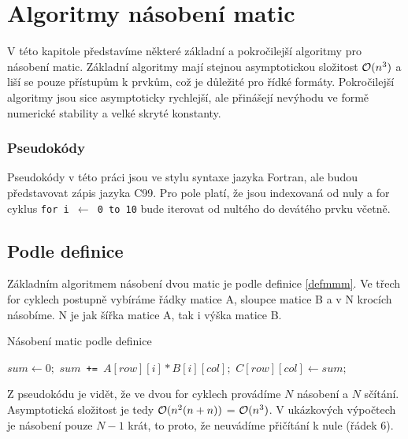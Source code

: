 \chapter{Algoritmy násobení matic}
\label{algo}

V této kapitole představíme některé základní a pokročilejší algoritmy pro násobení matic. Základní algoritmy mají stejnou asymptotickou složitost $\mathcal{O}(n^3)$ a liší se pouze přístupům k prvkům, což je důležité pro řídké formáty. Pokročilejší algoritmy jsou sice asymptoticky rychlejší, ale přinášejí nevýhodu ve formě numerické stability a velké skryté konstanty.

\subsection{Pseudokódy}

Pseudokódy v této práci jsou ve stylu syntaxe jazyka Fortran, ale budou představovat zápis jazyka C99. Pro pole platí, že jsou indexovaná od nuly a for cyklus \texttt{for i $\gets$ 0 to 10} bude iterovat od nultého do devátého prvku včetně.

\section{Podle definice}

Základním algoritmem násobení dvou matic je podle definice \ref{defmmm}. Ve třech for cyklech postupně  vybíráme řádky matice A, sloupce matice B a v N krocích násobíme. N je jak šířka matice A, tak i výška matice B.

\begin{algorithm}[H]
	\caption{Násobení matic podle definice}\label{mmm-by-definiton}
	\begin{algorithmic}[1]
		\State \texttt{$sum \gets 0;$}
			\State \texttt{$sum $ += $ A[row][i] * B[i][col];$}
		\EndFor
		\State \texttt{$C[row][col] \gets sum;$}
	\EndFor
\EndFor
		\EndProcedure
	\end{algorithmic}
\end{algorithm}

Z pseudokódu je vidět, že ve dvou for cyklech provádíme $N$ násobení a $N$ sčítání. Asymptotická složitost je tedy $\mathcal{O}(n^2(n + n))$ = $\mathcal{O}(n^3)$. V ukázkových výpočtech je násobení pouze $N-1$ krát, to proto, že neuvádíme přičítání k nule (řádek 6).

